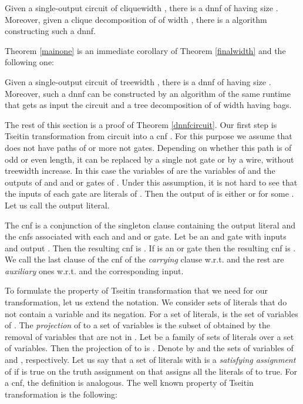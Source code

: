 \documentclass{llncs}
\begin{document}
\begin{theorem} \label{mainone}
Given a single-output circuit  of cliquewidth ,
there is a {\sc dnnf} of   having size .
Moreover, given a clique decomposition of  of width , there is a 
 algorithm constructing such a {\sc dnnf}.
\end{theorem}

Theorem \ref{mainone} is an immediate corollary of Theorem \ref{finalwidth} and the following one:
\begin{theorem} \label{dnnfcircuit}
Given a single-output circuit  of treewidth , there is  a {\sc dnnf} of  having size .
Moreover, such a {\sc dnnf} can be constructed by an algorithm of the same runtime that gets
as input the circuit  and a tree decomposition of  of width  having  bags.
\end{theorem}


The rest of this section is a proof of Theorem \ref{dnnfcircuit}.
Our first step is Tseitin transformation from circuit  into a {\sc cnf} .
For this purpose we assume that  does not have paths of  or more {\sc not} gates.
Depending on whether this path is of odd or even length, it can be replaced by a single
{\sc not} gate or by a wire, without treewidth increase. In this case the variables 
of  are the variables of  and the outputs of {\sc and} and {\sc or} gates of .
Under this assumption, it is not hard to see that the inputs of each gate are literals 
of . Then the output  of  is either  or  for some .
Let us call  the output literal. 

The {\sc cnf}  is a conjunction of the singleton clause containing the output literal and the 
{\sc cnf}s associated with each {\sc and} and {\sc or} gate. Let  be an {\sc and} gate with inputs 
 and output . Then the resulting {\sc cnf} is 
. 
If  is an {\sc or} gate then the resulting {\sc cnf} is 
.
We call the last clause of the {\sc cnf} of  the \emph{carrying} clause w.r.t.  and the rest 
are \emph{auxiliary} ones w.r.t.  and the corresponding input. 

To formulate the property of Tseitin transformation that we need for our transformation, let us extend
the notation. We consider sets of literals that do not contain a variable and its negation.
For a set  of literals,  is the set of variables of . 
The \emph{projection}  of  to a set  of variables is the subset  of  
obtained by the removal of variables that are not in .
Let  be a family of sets of literals over a set  of variables. Then the projection
 of  to  is .
Denote by  and  the sets of variables of  and , respectively. Let us say
that a set  of literals with  is a \emph{satisfying assignment} of  if  is
true on the truth assignment on  that assigns all the literals of  to true. For a {\sc cnf},
the definition is analogous. The well known property of Tseitin transformation is the following:
\end{document}
